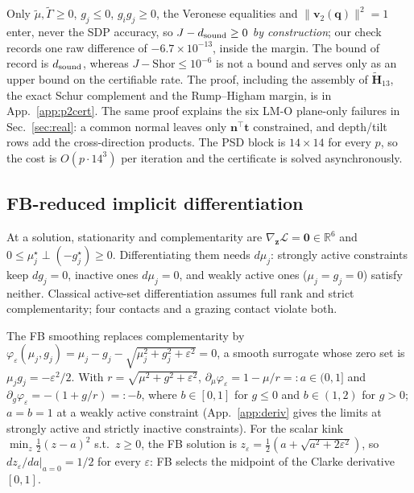 Only $\tilde\mu,\tilde\Gamma\ge0$, $g_j\le0$, $g_ig_j\ge0$, the Veronese equalities and $\|\mathbf v_2(\mathbf q)\|^2=1$ enter, never the SDP accuracy, so $J-d_{\rm sound}\ge0$ \emph{by construction}; our check records one raw difference of $-6.7\times10^{-13}$, inside the margin. The bound of record is $d_{\rm sound}$, whereas $J-\mathrm{Shor}\le10^{-6}$ is not a bound and serves only as an upper bound on the certifiable rate. The proof, including the assembly of $\tilde{\mathbf H}_{13}$, the exact Schur complement and the Rump--Higham margin, is in App.~\ref{app:p2cert}. The same proof explains the six LM-O plane-only failures in Sec.~\ref{sec:real}: a common normal leaves only $\mathbf n^\top\mathbf t$ constrained, and depth/tilt rows add the cross-direction products. The PSD block is $14\times14$ for every $p$, so the cost is $O(p\cdot14^3)$ per iteration and the certificate is solved asynchronously.

\subsection{FB-reduced implicit differentiation}\label{sec:fb}
At a solution, stationarity and complementarity are $\nabla_{\mathbf z}\mathcal L=\mathbf 0\in\mathbb{R}^6$ and $0\le\mu_j^\star\perp(-g_j^\star)\ge0$. Differentiating them needs $d\mu_j$: strongly active constraints keep $dg_j=0$, inactive ones $d\mu_j=0$, and weakly active ones ($\mu_j=g_j=0$) satisfy neither. Classical active-set differentiation assumes full rank and strict complementarity; four contacts and a grazing contact violate both.

The FB smoothing replaces complementarity by $\varphi_\varepsilon(\mu_j,g_j)=\mu_j-g_j-\sqrt{\mu_j^2+g_j^2+\varepsilon^2}=0$, a smooth surrogate whose zero set is $\mu_jg_j=-\varepsilon^2/2$. With $r=\sqrt{\mu^2+g^2+\varepsilon^2}$, $\partial_\mu\varphi_\varepsilon=1-\mu/r=:a\in(0,1]$ and $\partial_g\varphi_\varepsilon=-(1+g/r)=:-b$, where $b\in[0,1]$ for $g\le0$ and $b\in(1,2)$ for $g>0$; $a=b=1$ at a weakly active constraint (App.~\ref{app:deriv} gives the limits at strongly active and strictly inactive constraints). For the scalar kink $\min_z\tfrac12(z-a)^2$ s.t.\ $z\ge0$, the FB solution is $z_\varepsilon=\tfrac12(a+\sqrt{a^2+2\varepsilon^2})$, so $dz_\varepsilon/da|_{a=0}=1/2$ for every $\varepsilon$: FB selects the midpoint of the Clarke derivative $[0,1]$.


